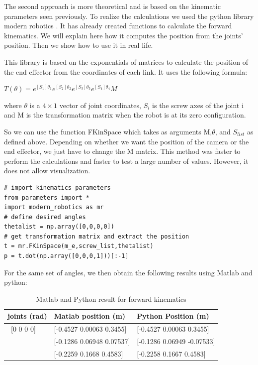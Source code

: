 \bigbreak
The second approach is more theoretical and is based on the kinematic parameters seen previously. To realize the calculations we used the python library modern robotics \cite{Mordern_Robotic}. It has already created functions to calculate the forward kinematics. We will explain here how it computes the position from the joints' position. Then we show how to use it in real life.

\bigbreak
This library is based on the exponentials of matrices to calculate the position of the end effector from the coordinates of each link. It uses the following formula: 

\begin{center}
    $T(\theta) = e^{[S_1]\theta_1}e^{[S_2]\theta_2}e^{[S_3]\theta_3}e^{[S_4]\theta_4}M$    
\end{center}
where $\theta$ is a $4\times1$ vector of joint coordinates, $S_i$ is the screw axes of the joint i and M is the transformation matrix when the robot is at its zero configuration.


\bigbreak
So we can use the function FKinSpace which takes as arguments M,$\theta$, and $S_{list}$ as defined above. Depending on whether we want the position of the camera or the end effector, we just have to change the M matrix. This method was faster to perform the calculations and faster to test a large number of values. However, it does not allow visualization.

\begin{verbatim}
# import kinematics parameters
from parameters import * 
import modern_robotics as mr
# define desired angles 
thetalist = np.array([0,0,0,0])
# get transformation matrix and extract the position
t = mr.FKinSpace(m_e,screw_list,thetalist)
p = t.dot(np.array([0,0,0,1]))[:-1]
\end{verbatim}

\bigbreak
For the same set of angles, we then obtain the following results using Matlab and python: 
\begin{table}[ht]
    \centering
    \begin{tabular}{|p{4cm} | p{4.5cm} | p{4.5cm}|} 
        \hline
        \textbf{joints (rad)} & \textbf{Matlab position (m)} & \textbf{Python Position (m)}\\ [0.3ex] 
        \hline\
        [0 0 0 0] & [-0.4527 0.00063 0.3455] & [-0.4527 0.00063 0.3455] \\ 
        \hline
        [pi/4,-pi/3,0,pi/3] & [-0.1286 0.06948 0.07537] & [-0.1286  0.06949 -0.07533] \\ 
        \hline
        [pi/4,pi/6,-pi/6,pi/3]& [-0.2259 0.1668 0.4583] & [-0.2258  0.1667  0.4583] \\ 
        \hline
    \end{tabular}
    \caption{Matlab and Python result for forward kinematics}
\end{table}


